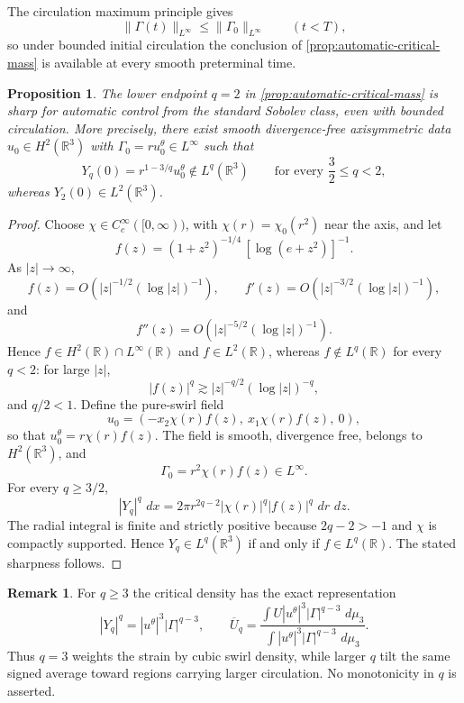 \documentclass[11pt]{article}
\numberwithin{equation}{section}
\newtheorem{proposition}[proposition]{Proposition}
\theoremstyle{definition}
\newtheorem{remark}[remark]{Remark}
\newcommand{\R}{\mathbb R}
\newcommand{\dd}{\,d}
\begin{document}
The circulation maximum principle gives
\[
 \|\Gamma(t)\|_{L^\infty}
 \le \|\Gamma_0\|_{L^\infty}
 \qquad (t<T),
\]
so under bounded initial circulation the conclusion of \cref{prop:automatic-critical-mass} is available at every smooth preterminal time.

\begin{proposition}\label{prop:q2-sharpness}
The lower endpoint $q=2$ in \cref{prop:automatic-critical-mass} is sharp for automatic control from the standard Sobolev class, even with bounded circulation.  More precisely, there exist smooth divergence-free axisymmetric data $u_0\in H^2(\R^3)$ with $\Gamma_0=ru_0^\theta\in L^\infty$ such that
\[
 Y_q(0)=r^{1-3/q}u_0^\theta\notin L^q(\R^3)
 \qquad\text{for every }\frac32\le q<2,
\]
whereas $Y_2(0)\in L^2(\R^3)$.
\end{proposition}

\begin{proof}
Choose $\chi\in C_c^\infty([0,\infty))$, with $\chi(r)=\chi_0(r^2)$ near the axis, and let
\[
 f(z)=(1+z^2)^{-1/4}\,[\log(e+z^2)]^{-1}.
\]
As $|z|\to\infty$,
\[
 f(z)=O\!\left(|z|^{-1/2}(\log|z|)^{-1}\right),\qquad
 f'(z)=O\!\left(|z|^{-3/2}(\log|z|)^{-1}\right),
\]
and
\[
 f''(z)=O\!\left(|z|^{-5/2}(\log|z|)^{-1}\right).
\]
Hence $f\in H^2(\R)\cap L^\infty(\R)$ and $f\in L^2(\R)$, whereas $f\notin L^q(\R)$ for every $q<2$: for large $|z|$,
\[
 |f(z)|^q\gtrsim |z|^{-q/2}(\log|z|)^{-q},
\]
and $q/2<1$.  Define the pure-swirl field
\[
 u_0=(-x_2\chi(r)f(z),\ x_1\chi(r)f(z),\ 0),
\]
so that $u_0^\theta=r\chi(r)f(z)$.  The field is smooth, divergence free, belongs to $H^2(\R^3)$, and
\[
 \Gamma_0=r^2\chi(r)f(z)\in L^\infty.
\]
For every $q\ge3/2$,
\[
 |Y_q|^q\,\dd x
 =2\pi r^{2q-2}|\chi(r)|^q|f(z)|^q\,\dd r\,\dd z.
\]
The radial integral is finite and strictly positive because $2q-2>-1$ and $\chi$ is compactly supported.  Hence $Y_q\in L^q(\R^3)$ if and only if $f\in L^q(\R)$.  The stated sharpness follows.
\end{proof}

\begin{remark}\label{rem:moment-tilt}
For $q\ge3$ the critical density has the exact representation
\begin{equation}\label{eq:moment-tilt}
 |Y_q|^q=|u^\theta|^3|\Gamma|^{q-3},
 \qquad
 \overline U_q
 =\frac{\int U|u^\theta|^3|\Gamma|^{q-3}\,\dd\mu_3}
 {\int |u^\theta|^3|\Gamma|^{q-3}\,\dd\mu_3}.
\end{equation}
Thus $q=3$ weights the strain by cubic swirl density, while larger $q$ tilt the same signed average toward regions carrying larger circulation.  No monotonicity in $q$ is asserted.
\end{remark}
\end{document}
